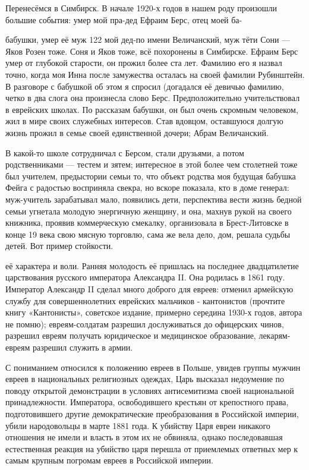 \label{121-2}
Перенесёмся в Симбирск. В начале 1920-х годов в нашем роду произошли большие события: умер мой пра-дед Ефраим Берс, отец моей ба-

\label{122-1}
бабушки, умер её муж 122 мой дед-по имени Величанский, муж тёти Сони — Яков Розен тоже. Соня и Яков тоже, всё похоронены в Симбирске. Ефраим Берс умер от глубокой старости, он прожил более ста лет. Фамилию его я назвал точно, когда моя Инна после замужества осталась на своей фамилии Рубинштейн. В разговоре с бабушкой об этом я спросил (догадался её девичью фамилию, четко в два слога она произнесла слово Берс. Предположительно учительствовал в еврейских школах. По рассказам бабушки, он был очень скромным человеком, жил в мире своих служебных интересов. Став вдовцом, оставшуюся долгую жизнь прожил в семье своей единственной дочери; Абрам Величанский.

\label{123-1}
В какой-то школе сотрудничал с Берсом, стали друзьями, а потом родственниками — тестем и зятем; интересное в этой более чем столетней тоже был учителем, предыстории семьи то, что объект родства моя будущая бабушка Фейга с радостью восприняла свекра, но вскоре показала, кто в доме генерал: муж-учитель зарабатывал мало, появились дети, перспектива вести жизнь бедной семьи угнетала молодую энергичную женщину, и она, махнув рукой на своего книжника, проявив коммерческую смекалку, организовала в Брест-Литовске в конце 19 века свою мясную торговлю, сама же вела дело, дом, решала судьбы детей. Вот пример стойкости.

\label{124-1}
её характера и воли. Ранняя молодость её пришлась на последнее двадцатилетие царствования русского императора Александра II. Она родилась в 1861 году. Император Александр II сделал много доброго для евреев: отменил армейскую службу для совершеннолетних еврейских мальчиков - кантонистов (прочтите книгу «Кантонисты», советское издание, примерно середина 1930-х годов, автора не помню); евреям-солдатам разрешил дослуживаться до офицерских чинов, разрешил евреям получать юридическое и медицинское образование, лекарям-евреям разрешил служить в армии.

\label{125-1}
С пониманием относился к положению евреев в Польше, увидев группы мужчин евреев в национальных религиозных одеждах, Царь высказал недоумение по поводу открытой демонстрации в условиях антисемитизма своей национальной принадлежности. Императора, освободившего крестьян от крепостного права, подготовившего другие демократические преобразования в Российской империи, убили народовольцы в марте 1881 года. К убийству Царя евреи никакого отношения не имели и власть в этом их не обвиняла, однако последовавшая естественная реакция на убийство царя перешла от приемлемых ответных мер к самым крупным погромам евреев в Российской империи.

